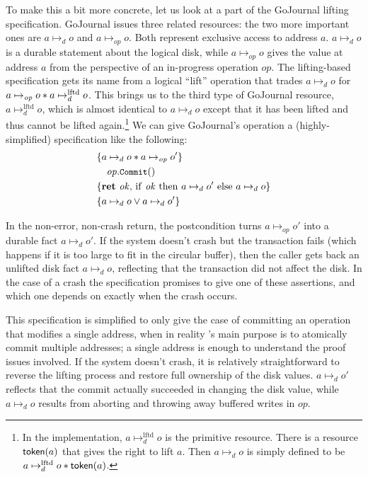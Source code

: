 \newcommand{\mapstoDisk}{\mapsto_d}
\newcommand{\mapstoOp}{\mapsto_{\mathit{op}}}
\newcommand{\mapstoLftd}{\mapsto_d^{\mathrm{lftd}}}
\newcommand{\jrnlToken}[1]{\textlog{token}(#1)}

To make this a bit more concrete, let us look at a part of the GoJournal lifting
specification. GoJournal issues three related resources: the two more important
ones are $a \mapstoDisk o$ and $a \mapstoOp o$. Both represent exclusive
access to address $a$. $a \mapstoDisk o$ is a durable statement about the
logical disk, while $a \mapstoOp o$ gives the value at address $a$ from the
perspective of an in-progress operation $op$. The lifting-based specification
gets its name from a logical ``lift'' operation that trades $a \mapstoDisk o$
for $a \mapstoOp o \sep a \mapstoLftd o$. This brings us to the
third type of GoJournal resource, $a \mapstoLftd o$, which is
almost identical to $a \mapstoDisk o$ except that it has been lifted and thus
cannot be lifted again.\footnote{In the implementation,
$a \mapstoLftd o$ is the primitive resource. There is a
resource $\jrnlToken{a}$ that gives the right to lift $a$. Then
$a \mapstoDisk o$ is simply defined to be
$a \mapstoLftd o \sep \jrnlToken{a}$.} We can give
GoJournal's  operation a
(highly-simplified) specification like the following:
%
\begin{align*}
  \hoareCV{a \mapstoDisk o \sep a \mapstoOp o'} %
  {\mathit{op}.\cc{Commit}()}%
  {\Ret{\mathit{ok}} \mathrm{if~} \mathit{ok} %
  \mathrm{~then~} a \mapstoDisk o' \mathrm{~else~} a \mapstoDisk o}%
  {a \mapstoDisk o \lor a \mapstoDisk o'}
\end{align*}

In the non-error, non-crash return, the postcondition turns $a \mapstoOp o'$
into a durable fact $a \mapstoDisk o'$. If the system doesn't crash but the
transaction fails (which happens if it is too large to fit in the circular
buffer), then the caller gets back an unlifted disk fact $a \mapstoDisk o$,
reflecting that the transaction did not affect the disk. In the case of a crash
the specification promises to give one of these assertions, and which one
depends on exactly when the crash occurs.

This specification is simplified to only give the case of committing an
operation that modifies a single address, when in reality 's main purpose
is to atomically commit multiple addresses; a single address is enough to
understand the proof issues involved. If the system doesn't crash, it is
relatively straightforward to reverse the lifting process and restore full
ownership of the disk values. $a \mapstoDisk o'$ reflects that the commit
actually succeeded in changing the disk value, while $a \mapstoDisk o$ results
from aborting and throwing away buffered writes in $op$.

